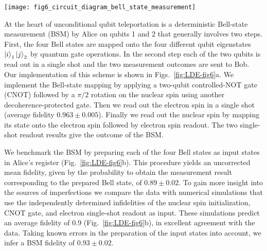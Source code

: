 \begin{figure*}
	\centering
    \texttt{[image: fig6\_circuit\_diagram\_bell\_state\_measurement]}
    \caption{
    \label{fig:LDE-fig6} 
    \textbf{Deterministic Bell-state measurement (BSM) and real-time feed-forward.}
    (a) Circuit diagram of our implementation. The label `e' (`N') indicates operations acting on the electron spin (nitrogen nuclear spin). To enhance the readout fidelity for the nuclear spin, we perform the mapping to the electron spin via a CNOT and the subsequent electron readout twice. While Alice is performing her BSM Bob applies an XY4 decoupling sequence on his electron qubit. After receiving the BSM outcome from Alice, Bob applies the feed-forward operation $U$ and reads out his qubit. $\pi_{x,y}$ denote rotations around the $x$-axis and $y$-axis, respectively. 
    (b) Calibration of the BSM by inserting the four different Bell states on Alice's side and determining the probability with which the ideal outcome is observed (blue bars). Data is not corrected for imperfect preparation of the input states. Expectations based on independently determined experimental imperfections are shown in orange. Error bars are two statistical s.d.
    }
\end{figure*}


At the heart of unconditional qubit teleportation is a deterministic Bell-state measurement (BSM) by Alice on qubits 1 and 2 that generally involves two steps. First, the four Bell states are mapped onto the four different qubit eigenstates $\left|i\right\rangle_1 \left|j\right\rangle_2$ by quantum gate operations. In the second step each of the two qubits is read out in a single shot and the two measurement outcomes are sent to Bob. Our implementation of this scheme is shown in Figs.~\ref{fig:LDE-fig6}a. We implement the Bell-state mapping by applying a two-qubit controlled-NOT gate (CNOT) followed by a $\pi/2$ rotation on the nuclear spin using another decoherence-protected gate. Then we read out the electron spin in a single shot (average fidelity $0.963\pm0.005$). Finally we read out the nuclear spin by mapping its state onto the electron spin followed by electron spin readout. The two single-shot readout results give the outcome of the BSM.

We benchmark the BSM by preparing each of the four Bell states as input states in Alice's register (Fig.~\ref{fig:LDE-fig6}b). This procedure yields an uncorrected mean fidelity, given by the probability to obtain the measurement result corresponding to the prepared Bell state, of $0.89\pm0.02$. To gain more insight into the sources of imperfections we compare the data with numerical simulations that use the independently determined infidelities of the nuclear spin initialization, CNOT gate, and electron single-shot readout as input. These simulations predict an average fidelity of 0.9 (Fig.~\ref{fig:LDE-fig6}b), in excellent agreement with the data. Taking known errors in the preparation of the input states into account, we infer a BSM fidelity of $0.93\pm0.02$.

